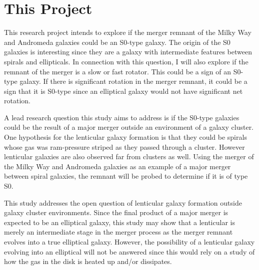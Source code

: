 \documentclass[fleqn,usenatbib]{mnras}
\begin{document}

\section{This Project}
This research project intends to explore if the merger remnant of the Milky Way and Andromeda galaxies could be an S0-type galaxy. The origin of the S0 galaxies is interesting since they are a galaxy with intermediate features between spirals and ellipticals. In connection with this question, I will also explore if the remnant of the merger is a slow or fast rotator. This could be a sign of an S0-type galaxy. If there is significant rotation in the merger remnant, it could be a sign that it is S0-type since an elliptical galaxy would not have significant net rotation.

A lead research question this study aims to address is if the S0-type galaxies could be the result of a major merger outside an environment of a galaxy cluster. One hypothesis for the lenticular galaxy formation is that they could be spirals whose gas was ram-pressure striped as they passed through a cluster. However lenticular galaxies are also observed far from clusters as well. Using the merger of the Milky Way and Andromeda galaxies as an example of a major merger between spiral galaxies, the remnant will be probed to determine if it is of type S0.

This study addresses the open question of lenticular galaxy formation outside galaxy cluster environments. Since the final product of a major merger is expected to be an elliptical galaxy, this study may show that a lenticular is merely an intermediate stage in the merger process as the merger remnant evolves into a true elliptical galaxy. However, the possibility of a lenticular galaxy evolving into an elliptical will not be answered since this would rely on a study of how the gas in the disk is heated up and/or dissipates. 
\end{document}

